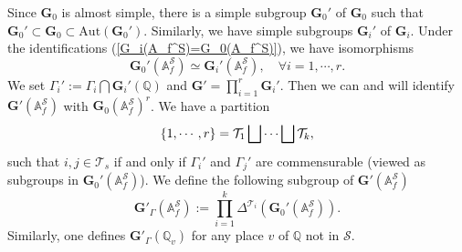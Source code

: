 \documentclass[11pt,oneside,reqno]{amsart}
\newcommand{\bfG}{\mathbf{G}}
\newcommand{\A}{\mathbb{A}}
\newcommand{\Q}{\mathbb{Q}}
\newcommand{\Scal}{\mathcal{S}}
\newcommand{\Tcal}{\mathcal{T}}
\newcommand{\Gbf}{\mathbf{G}}
\theoremstyle{plain}
\begin{document}
	
	Since $\bfG_0$ is almost simple, there is a simple subgroup $\bfG_0'$ of $\bfG_0$ such that $\bfG_0'\subset\bfG_0\subset\mathrm{Aut}(\bfG_0')$. Similarly, we have simple subgroups $\bfG_i'$ of $\bfG_i$. Under the identifications (\ref{G_i(A_f^S)=G_0(A_f^S)}), we have isomorphisms
	\[
	\Gbf_0'(\A_f^\Scal)\simeq\Gbf_i'(\A_f^\Scal),
	\quad
	\forall
	i=1,\cdots,r.
	\]
	We set $\Gamma_i':=\Gamma_i\bigcap\Gbf_i'(\Q)$ and $\bfG'=\prod_{i=1}^r\bfG_i'$.
	Then we can and will identify $\Gbf'(\A_f^\Scal)$ with $\Gbf_0(\A_f^\Scal)^r$. We have a partition
	\begin{equation}\label{partition of {1,2,...,r}}
		\{1,\cdots,r\}=\Tcal_1\bigsqcup\cdots\bigsqcup\Tcal_k,
	\end{equation}
	such that $i,j\in\Tcal_s$ if and only if $\Gamma_i'$ and $\Gamma_j'$ are commensurable (viewed as subgroups in $\Gbf_0'(\A_f^\Scal)$). We define the following subgroup of $\Gbf'(\A_f^\Scal)$
	\[
	\Gbf'_\Gamma(\A_f^\Scal)
	:=
	\prod_{i=1}^k\Delta^{\Tcal_i}(\Gbf_0'(\A_f^\Scal)).
	\]
	Similarly, one defines $\Gbf'_\Gamma(\Q_v)$ for any place $v$ of $\Q$ not in $\Scal$.
	
	
	
	
	
\end{document}
